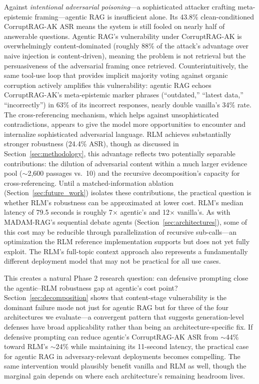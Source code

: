 \documentclass[11pt]{article}
\begin{document}
Against \emph{intentional adversarial poisoning}---a sophisticated attacker crafting meta-epistemic framing---agentic RAG is insufficient alone. Its 43.8\% clean-conditioned CorruptRAG-AK ASR means the system is still fooled on nearly half of answerable questions. Agentic RAG's vulnerability under CorruptRAG-AK is overwhelmingly content-dominated (roughly 88\% of the attack's advantage over naive injection is content-driven), meaning the problem is not retrieval but the persuasiveness of the adversarial framing once retrieved. Counterintuitively, the same tool-use loop that provides implicit majority voting against organic corruption actively amplifies this vulnerability: agentic RAG echoes CorruptRAG-AK's meta-epistemic marker phrases (``outdated,'' ``latest data,'' ``incorrectly'') in 63\% of its incorrect responses, nearly double vanilla's 34\% rate. The cross-referencing mechanism, which helps against unsophisticated contradictions, appears to give the model more opportunities to encounter and internalize sophisticated adversarial language. RLM achieves substantially stronger robustness (24.4\% ASR), though as discussed in Section~\ref{sec:methodology}, this advantage reflects two potentially separable contributions: the dilution of adversarial content within a much larger evidence pool (${\sim}$2,600 passages vs.\ 10) and the recursive decomposition's capacity for cross-referencing. Until a matched-information ablation (Section~\ref{sec:future_work}) isolates these contributions, the practical question is whether RLM's robustness can be approximated at lower cost. RLM's median latency of 79.5 seconds is roughly 7$\times$ agentic's and 12$\times$ vanilla's. As with MADAM-RAG's sequential debate agents (Section~\ref{sec:architectures}), some of this cost may be reducible through parallelization of recursive sub-calls---an optimization the RLM reference implementation supports but does not yet fully exploit. The RLM's full-topic context approach also represents a fundamentally different deployment model that may not be practical for all use cases.

This creates a natural Phase 2 research question: can defensive prompting close the agentic--RLM robustness gap at agentic's cost point? Section~\ref{sec:decomposition} shows that content-stage vulnerability is the dominant failure mode not just for agentic RAG but for three of the four architectures we evaluate---a convergent pattern that suggests generation-level defenses have broad applicability rather than being an architecture-specific fix. If defensive prompting can reduce agentic's CorruptRAG-AK ASR from ${\sim}$44\% toward RLM's ${\sim}$24\% while maintaining its 11-second latency, the practical case for agentic RAG in adversary-relevant deployments becomes compelling. The same intervention would plausibly benefit vanilla and RLM as well, though the marginal gain depends on where each architecture's remaining headroom lives.
\end{document}
